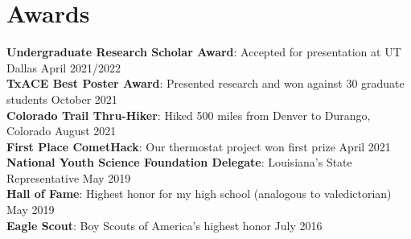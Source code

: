 \documentclass[letterpaper,11pt]{article}
\begin{document}
\section{Awards}
 \begin{itemize}[leftmargin=0.15in, label={}]
    \small{\item{
     \textbf{Undergraduate Research Scholar Award}{: Accepted for presentation at UT Dallas} \hspace{70 pt}April 2021/2022 \\
     \textbf{TxACE Best Poster Award}{: Presented research and won against 30 graduate students} \hspace{70 pt}October 2021\\
     \textbf{Colorado Trail Thru-Hiker}{: Hiked 500 miles from Denver to Durango, Colorado} \hspace{103 pt}August 2021\\
     \textbf{First Place CometHack}{: Our thermostat project won first prize} \hspace{186 pt}April 2021\\
     \textbf{National Youth Science Foundation Delegate}{: Louisiana's State Representative} \hspace{106 pt}May 2019\\
     \textbf{Hall of Fame}{: Highest honor for my high school (analogous to valedictorian)} \hspace{138 pt}May 2019\\
     \textbf{Eagle Scout}{: Boy Scouts of America's highest honor} \hspace{246 pt}July 2016
    }}
 \end{itemize}
\end{document}
